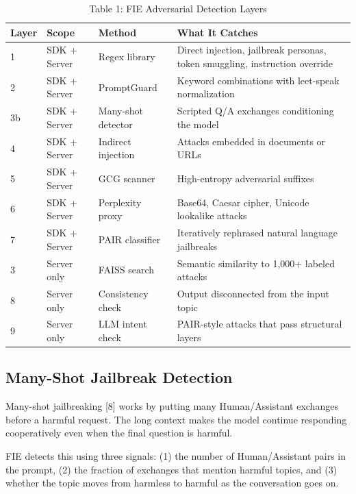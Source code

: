 \documentclass[12pt,a4paper]{article}
\begin{document}
\begin{table}[H]
\centering
\caption{Table 1: FIE Adversarial Detection Layers}
\vspace{4pt}
\begin{tabular}{p{1.0cm} p{2.5cm} p{2.5cm} p{6.5cm}}
\toprule
\textbf{Layer} & \textbf{Scope} & \textbf{Method} & \textbf{What It Catches} \\
\midrule
1  & SDK + Server & Regex library    & Direct injection, jailbreak personas, token smuggling, instruction override \\
2  & SDK + Server & PromptGuard      & Keyword combinations with leet-speak normalization \\
3b & SDK + Server & Many-shot detector & Scripted Q/A exchanges conditioning the model \\
4  & SDK + Server & Indirect injection & Attacks embedded in documents or URLs \\
5  & SDK + Server & GCG scanner      & High-entropy adversarial suffixes \\
6  & SDK + Server & Perplexity proxy  & Base64, Caesar cipher, Unicode lookalike attacks \\
7  & SDK + Server & PAIR classifier  & Iteratively rephrased natural language jailbreaks \\
3  & Server only  & FAISS search     & Semantic similarity to 1,000+ labeled attacks \\
8  & Server only  & Consistency check & Output disconnected from the input topic \\
9  & Server only  & LLM intent check  & PAIR-style attacks that pass structural layers \\
\bottomrule
\end{tabular}
\end{table}

\subsection{Many-Shot Jailbreak Detection}

Many-shot jailbreaking [8] works by putting many Human/Assistant exchanges
before a harmful request. The long context makes the model continue responding
cooperatively even when the final question is harmful.

FIE detects this using three signals: (1) the number of Human/Assistant pairs
in the prompt, (2) the fraction of exchanges that mention harmful topics, and
(3) whether the topic moves from harmless to harmful as the conversation goes on.
\end{document}
